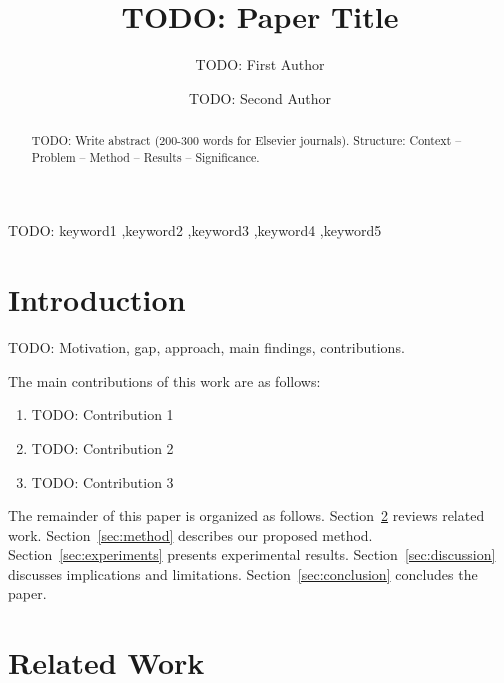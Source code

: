 \documentclass[preprint,12pt]{elsarticle}
\begin{document}
\begin{frontmatter}

\title{TODO: Paper Title}

\author[addr1]{TODO: First Author}
\author[addr2]{TODO: Second Author}

\address[addr1]{TODO: Department, University, City, Country}
\address[addr2]{TODO: Department, University, City, Country}

\begin{abstract}
TODO: Write abstract (200-300 words for Elsevier journals).
Structure: Context -- Problem -- Method -- Results -- Significance.
\end{abstract}

\begin{keyword}
TODO: keyword1 \sep keyword2 \sep keyword3 \sep keyword4 \sep keyword5
\end{keyword}

\end{frontmatter}

\section{Introduction}
\label{sec:introduction}

TODO: Motivation, gap, approach, main findings, contributions.

The main contributions of this work are as follows:
\begin{enumerate}
  \item TODO: Contribution 1
  \item TODO: Contribution 2
  \item TODO: Contribution 3
\end{enumerate}

The remainder of this paper is organized as follows. Section~\ref{sec:related_work} reviews related work. Section~\ref{sec:method} describes our proposed method. Section~\ref{sec:experiments} presents experimental results. Section~\ref{sec:discussion} discusses implications and limitations. Section~\ref{sec:conclusion} concludes the paper.

\section{Related Work}
\label{sec:related_work}
\end{document}
